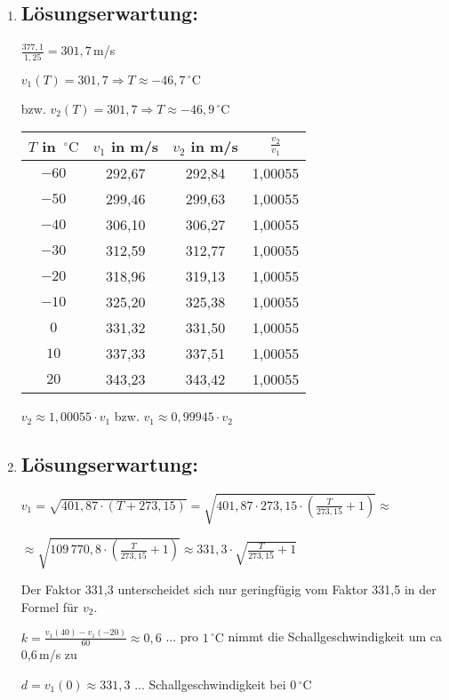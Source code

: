 \begin{langesbeispiel}
{\begin{enumerate}
mittlere Fallbeschleunigung: $a=\frac{377,1}{50}=7,54$\,m/s$^2$
	
	\item \subsection{Lösungserwartung:}
	
	$\frac{377,1}{1,25}=301,7$\,m/s
	
	$v_1(T)=301,7 \Rightarrow T\approx -46,7\,^\circ\text{C}$
	
	bzw. $v_2(T)=301,7 \Rightarrow T\approx -46,9\,^\circ\text{C}$
	
	\begin{center}
		\begin{tabular}{|c|c|c|c|}\hline
		\cellcolor[gray]{0.9}$T$ in $\,^\circ\text{C}$&\cellcolor[gray]{0.9}$v_1$ in m/s&\cellcolor[gray]{0.9}$v_2$ in m/s&\cellcolor[gray]{0.9}$\frac{v_2}{v_1}$\\ \hline
		$-60$&292,67&292,84&1,00055\\ \hline
		$-50$&299,46&299,63&1,00055\\ \hline
		$-40$&306,10&306,27&1,00055\\ \hline
		$-30$&312,59&312,77&1,00055\\ \hline
		$-20$&318,96&319,13&1,00055\\ \hline
		$-10$&325,20&325,38&1,00055\\ \hline
		$0$&331,32&331,50&1,00055\\ \hline
		$10$&337,33&337,51&1,00055\\ \hline
		$20$&343,23&343,42&1,00055\\ \hline		
		\end{tabular}
	\end{center}
	
	$v_2\approx 1,00055\cdot v_1$ bzw. $v_1\approx 0,99945\cdot v_2$

\item \subsection{Lösungserwartung:}
	
$v_1=\sqrt{401,87\cdot (T+273,15)}=\sqrt{401,87\cdot 273,15\cdot(\frac{T}{273,15}+1)}\approx$

$\approx\sqrt{109\,770,8\cdot(\frac{T}{273,15}+1)}\approx 331,3\cdot\sqrt{\frac{T}{273,15}+1}$

Der Faktor 331,3 unterscheidet sich nur geringfügig vom Faktor 331,5 in der Formel für $v_2$.\leer

$k=\frac{v_1(40)-v_1(-20)}{60}\approx 0,6$ ... pro $1\,^\circ\text{C}$ nimmt die Schallgeschwindigkeit um ca 0,6\,m/s zu

$d=v_1(0)\approx 331,3$ ... Schallgeschwindigkeit bei $0\,^\circ\text{C}$
\end{enumerate}}
		\end{langesbeispiel}